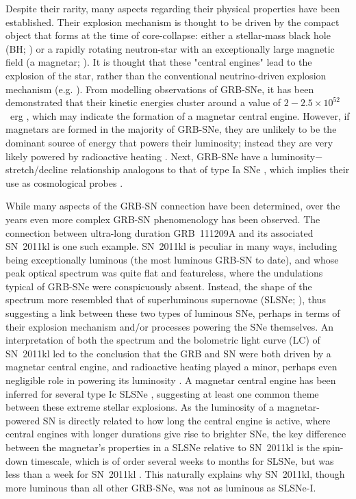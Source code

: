 \documentclass[traditabstract,longauth]{aa}
\begin{document}
Despite their rarity, many aspects regarding their physical properties have been established.  Their explosion mechanism is thought to be driven by the compact object that forms at the time of core-collapse: either a stellar-mass black hole (BH; \citealt{Woosley93,MacWoos1999}) or a rapidly rotating neutron-star with an exceptionally large magnetic field (a magnetar; \citealt{Usov92,ThompsonDuncan93,Bucciantini07}).  It is thought that these "central engines" lead to the explosion of the star, rather than the conventional neutrino-driven explosion mechanism (e.g. \citealt{Sukhbold16}).  From modelling observations of GRB-SNe, it has been demonstrated that their kinetic energies cluster around a value of $2-2.5 \times 10^{52}$~erg \citep{Mazzali14}, which may indicate the formation of a magnetar central engine.  However, if magnetars are formed in the majority of GRB-SNe, they are unlikely to be the dominant source of energy that powers their luminosity; instead they are very likely powered by radioactive heating \citep{CJM16}.  Next, GRB-SNe have a luminosity$-$stretch/decline relationship \citep{Cano14,LiHjorth2014,CJG14} analogous to that of type Ia SNe \citep{Phillips93}, which implies their use as cosmological probes \citep{LHW14,CJG14}.

While many aspects of the GRB-SN connection have been determined, over the years even more complex GRB-SN phenomenology has been observed.  The connection between ultra-long duration \citep{Levan14} GRB~111209A and its associated SN~2011kl \citep{Greiner15,Kann16} is one such example.  SN~2011kl is peculiar in many ways, including being exceptionally luminous (the most luminous GRB-SN to date), and whose peak optical spectrum was quite flat and featureless, where the undulations typical of GRB-SNe were conspicuously absent.  Instead, the shape of the spectrum more resembled that of superluminous supernovae (SLSNe; \citealt{Quimby11,GalYam12}), thus suggesting a link between these two types of luminous SNe, perhaps in terms of their explosion mechanism and/or processes powering the SNe themselves.  An interpretation of both the spectrum and the bolometric light curve (LC) of SN~2011kl led to the conclusion that the GRB and SN were both driven by a magnetar central engine, and radioactive heating played a minor, perhaps even negligible role in powering its luminosity \citep{Greiner15,Metzger15,Bersten16,CJM16,GompFruch17}.  A magnetar central engine has been inferred for several type Ic SLSNe \citep{Chatzopoulos11,Inserra13,Nicholl13,Chen15}, suggesting at least one common theme between these extreme stellar explosions.  As the luminosity of a magnetar-powered SN is directly related to how long the central engine is active, where central engines with longer durations give rise to brighter SNe, the key difference between the magnetar's properties in a SLSNe relative to SN~2011kl is the spin-down timescale, which is of order several weeks to months for SLSNe, but was less than a week for SN~2011kl \citep{CJM16}.  This naturally explains why SN~2011kl, though more luminous than all other GRB-SNe, was not as luminous as SLSNe-I.
\end{document}
